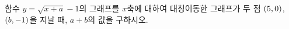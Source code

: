 함수 $y=\sqrt{x+a}-1$의 그래프를 $x$축에 대하여 대칭이동한 그래프가 두 점 $(5{,}\mkern3mu\mathopen{}0)$, $(b{,}\mkern3mu\mathopen{}-1)$을 지날 때, $a+b$의 값을 구하시오. 

